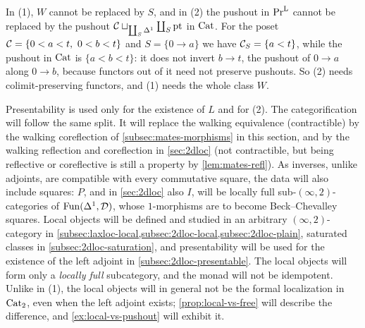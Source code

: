 %
In (1), $W$ cannot be replaced by $S$, and in (2) the pushout in $\operatorname{Pr}^{\operatorname{L}}$ cannot
be replaced by the pushout
$\mathcal{C} \sqcup_{\coprod_{S}\Delta^{1}} \coprod_{S}\mathrm{pt}$
in $\mathrm{Cat}$. For the poset
$\mathcal{C} = \{0 < a < t,\ 0 < b < t\}$
and $S = \{0 \to a\}$ we have $\mathcal{C}_{S} = \{a < t\}$,
while the pushout in $\mathrm{Cat}$ is $\{a < b < t\}$: it does not invert $b \to t$,
the pushout of $0 \to a$ along $0 \to b$,
because functors out of it need not preserve pushouts.
So (2) needs colimit-preserving functors, and (1) needs the whole class $W$.

%
Presentability is used only for the existence of $L$ and for (2).
The categorification will follow the same split.
It will replace the walking equivalence (contractible) by the walking
coreflection of \cref{subsec:mates-morphisms} in this section, and by the
walking reflection and coreflection in \cref{sec:2dloc} (not contractible,
but being reflective or coreflective is still a property by
\cref{lem:mates-refl}). As inverses, unlike adjoints,
are compatible with every commutative square,
the data will also include squares: $P$, and in \cref{sec:2dloc} also $I$, will
be locally full sub-$(\infty,2)$-categories of $\operatorname{Fun}(\Delta^{1},\mathcal{D})$,
whose $1$-morphisms are to become Beck--Chevalley squares.
Local objects will be defined and studied in an arbitrary $(\infty,2)$-category
in \cref{subsec:laxloc-local,subsec:2dloc-local,subsec:2dloc-plain},
saturated classes in \cref{subsec:2dloc-saturation},
and presentability will be used for the existence of the left adjoint in
\cref{subsec:2dloc-presentable}.
The local objects will form only a \emph{locally full} subcategory,
and the monad will not be idempotent. Unlike in (1),
the local objects will in general not be the formal localization in $\mathrm{Cat}_{2}$,
even when the left adjoint exists; \cref{prop:local-vs-free} will describe the
difference, and \cref{ex:local-vs-pushout} will exhibit it.
